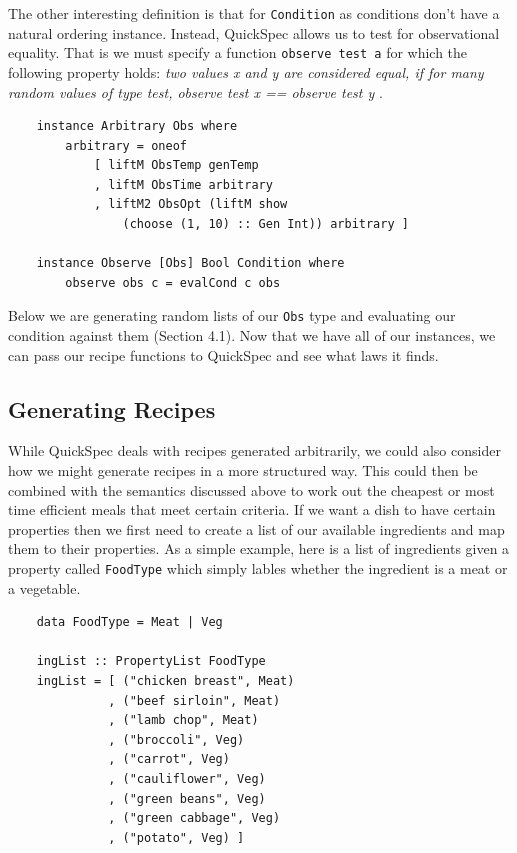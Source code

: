 \documentclass[11pt]{article}
\begin{document}
\medbreak

The other interesting definition is that for \texttt{Condition} as conditions don't
have a natural ordering instance. Instead, QuickSpec allows us to test for observational
equality. That is we must specify a function \texttt{observe test a} for which the
following property holds: \textit{two values x and y are considered equal,
if for many random values of type test, observe test x == observe test y} \cite{quickspec-docs}.

\begin{lstlisting}
    instance Arbitrary Obs where
        arbitrary = oneof
            [ liftM ObsTemp genTemp
            , liftM ObsTime arbitrary
            , liftM2 ObsOpt (liftM show
                (choose (1, 10) :: Gen Int)) arbitrary ]

    instance Observe [Obs] Bool Condition where
        observe obs c = evalCond c obs
\end{lstlisting}

Below we are generating random lists of our \texttt{Obs} type and evaluating our
condition against them (Section 4.1). Now that we have all of our instances,
we can pass our recipe functions to QuickSpec and see what laws it finds.

\subsection{Generating Recipes}

While QuickSpec deals with recipes generated arbitrarily, we could also
consider how we might generate recipes in a more structured way. This could
then be combined with the semantics discussed above to work out the cheapest
or most time efficient meals that meet certain criteria. If we want a dish
to have certain properties then we first need to create a list of our
available ingredients and map them to their properties. As a simple
example, here is a list of ingredients given a property called
\texttt{FoodType} which simply lables whether the ingredient is a meat
or a vegetable.

\begin{lstlisting}
    data FoodType = Meat | Veg

    ingList :: PropertyList FoodType
    ingList = [ ("chicken breast", Meat)
              , ("beef sirloin", Meat)
              , ("lamb chop", Meat)
              , ("broccoli", Veg)
              , ("carrot", Veg)
              , ("cauliflower", Veg)
              , ("green beans", Veg)
              , ("green cabbage", Veg)
              , ("potato", Veg) ]
\end{lstlisting}
\end{document}
